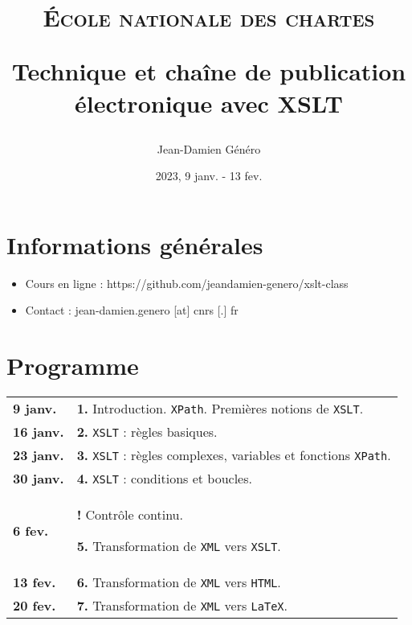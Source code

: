 \documentclass[a4paper]{article}
\title{\textsc{École nationale des chartes}

\bigskip

Technique et chaîne de publication électronique avec XSLT}
\author{Jean-Damien Généro}
\date{2023, 9 janv. - 13 fev.}
\begin{document}
\maketitle

\section*{Informations générales}

\begin{itemize}
    \item Cours en ligne : https://github.com/jeandamien-genero/xslt-class
    \item Contact : jean-damien.genero [at] cnrs [.] fr
\end{itemize}

\section*{Programme}

\renewcommand{\arraystretch}{1.5}
\begin{center}
    \begin{tabular}[h]{|p{2cm} p{9.6cm}}
        \textbf{9 janv.} & \textbf{1.} Introduction. \texttt{XPath}. Premières notions de \texttt{XSLT}.\\
        \textbf{16 janv.} & \textbf{2.} \texttt{XSLT} : règles basiques.  \\
        \textbf{23 janv.} & \textbf{3.} \texttt{XSLT} : règles complexes, variables et fonctions \texttt{XPath}. \\
        \textbf{30 janv.} & \textbf{4.} \texttt{XSLT} : conditions et boucles. \\
        \textbf{6 fev.} & \textbf{!}  Contrôle continu.
        
        \textbf{5.} Transformation de \texttt{XML}  vers \texttt{XSLT}. \\
        \textbf{13 fev.} & \textbf{6.} Transformation de \texttt{XML}  vers \texttt{HTML}. \\
        \textbf{20 fev.} & \textbf{7.} Transformation de \texttt{XML}  vers \texttt{LaTeX}. \\
    \end{tabular}
\end{center}
\end{document}
